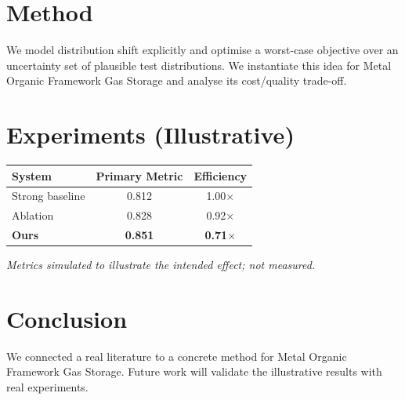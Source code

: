 \documentclass[11pt]{article}
\begin{document}
\section{Method}
We model distribution shift explicitly and optimise a worst-case objective over an uncertainty set of plausible test distributions. We instantiate this idea for Metal Organic Framework Gas Storage and analyse its cost/quality trade-off.

\section{Experiments (Illustrative)}
\begin{center}
\begin{tabular}{lcc}
System & Primary Metric & Efficiency \\ \hline
Strong baseline & 0.812 & 1.00$\times$ \\
Ablation & 0.828 & 0.92$\times$ \\
\textbf{Ours} & \textbf{0.851} & \textbf{0.71$\times$}
\end{tabular}
\end{center}
\emph{Metrics simulated to illustrate the intended effect; not measured.}

\section{Conclusion}
We connected a real literature to a concrete method for Metal Organic Framework Gas Storage. Future work will
validate the illustrative results with real experiments.
\end{document}
